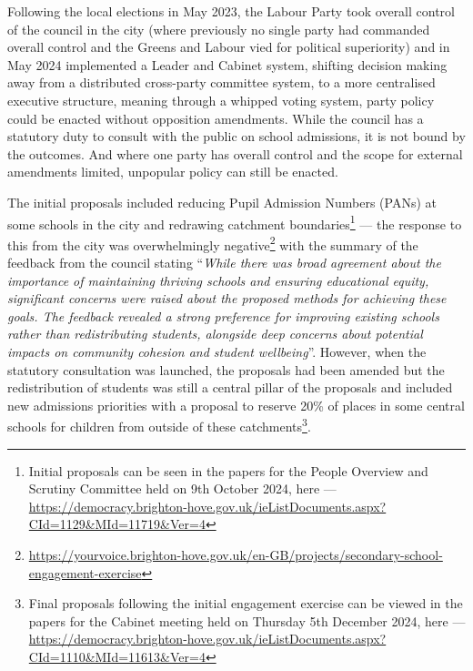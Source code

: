 \documentclass[
  11pt,
]{article}
\begin{document}
Following the local elections in May 2023, the Labour Party took overall
control of the council in the city (where previously no single party had
commanded overall control and the Greens and Labour vied for political
superiority) and in May 2024 implemented a Leader and Cabinet system,
shifting decision making away from a distributed cross-party committee
system, to a more centralised executive structure, meaning through a
whipped voting system, party policy could be enacted without opposition
amendments. While the council has a statutory duty to consult with the
public on school admissions, it is not bound by the outcomes. And where
one party has overall control and the scope for external amendments
limited, unpopular policy can still be enacted.

The initial proposals included reducing Pupil Admission Numbers (PANs)
at some schools in the city and redrawing catchment
boundaries\footnote{Initial proposals can be seen in the papers for the
  People Overview and Scrutiny Committee held on 9th October 2024, here
  ---
  \url{https://democracy.brighton-hove.gov.uk/ieListDocuments.aspx?CId=1129&MId=11719&Ver=4}}
--- the response to this from the city was overwhelmingly
negative\footnote{\url{https://yourvoice.brighton-hove.gov.uk/en-GB/projects/secondary-school-engagement-exercise}}
with the summary of the feedback from the council stating ``\emph{While
there was broad agreement about the importance of maintaining thriving
schools and ensuring educational equity, significant concerns were
raised about the proposed methods for achieving these goals. The
feedback revealed a strong preference for improving existing schools
rather than redistributing students, alongside deep concerns about
potential impacts on community cohesion and student wellbeing}''.
However, when the statutory consultation was launched, the proposals had
been amended but the redistribution of students was still a central
pillar of the proposals and included new admissions priorities with a
proposal to reserve 20\% of places in some central schools for children
from outside of these catchments\footnote{Final proposals following the
  initial engagement exercise can be viewed in the papers for the
  Cabinet meeting held on Thursday 5th December 2024, here ---
  \url{https://democracy.brighton-hove.gov.uk/ieListDocuments.aspx?CId=1110&MId=11613&Ver=4}}.
\end{document}
